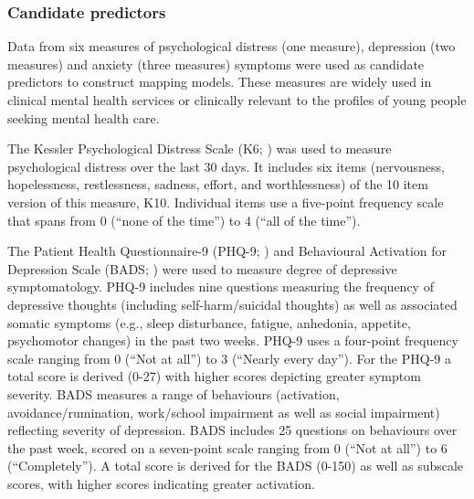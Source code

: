 \documentclass[
  journal=largetwo,
  manuscript=original-article,
  year=2023-Submission,
]{cup-journal}
\begin{document}
\subsubsection{Candidate predictors}

Data from six measures of psychological distress (one measure), depression (two measures) and anxiety (three measures) symptoms were used as candidate predictors to construct mapping models. These measures are widely used in clinical mental health services or clinically relevant to the profiles of young people seeking mental health care.

The Kessler Psychological Distress Scale (K6; \autocite{RN16}) was used to measure psychological distress over the last 30 days. It includes six items (nervousness, hopelessness, restlessness, sadness, effort, and worthlessness) of the 10 item version of this measure, K10. Individual items use a five-point frequency scale that spans from 0 (``none of the time'') to 4 (``all of the time'').

The Patient Health Questionnaire-9 (PHQ-9; \autocite{RN11}) and Behavioural Activation for Depression Scale (BADS; \autocite{RN12}) were used to measure degree of depressive symptomatology. PHQ-9 includes nine questions measuring the frequency of depressive thoughts (including self-harm/suicidal thoughts) as well as associated somatic symptoms (e.g., sleep disturbance, fatigue, anhedonia, appetite, psychomotor changes) in the past two weeks. PHQ-9 uses a four-point frequency scale ranging from 0 (``Not at all'') to 3 (``Nearly every day''). For the PHQ-9 a total score is derived (0-27) with higher scores depicting greater symptom severity. BADS measures a range of behaviours (activation, avoidance/rumination, work/school impairment as well as social impairment) reflecting severity of depression. BADS includes 25 questions on behaviours over the past week, scored on a seven-point scale ranging from 0 (``Not at all'') to 6 (``Completely''). A total score is derived for the BADS (0-150) as well as subscale scores, with higher scores indicating greater activation.
\end{document}
